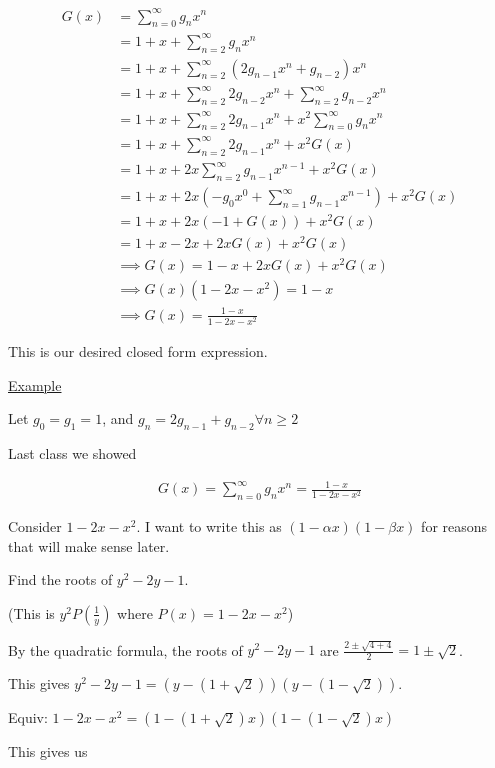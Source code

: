 \documentclass{article}
\begin{document}
\begin{align*}
    G(x) &= \sum_{n=0}^{\infty}g_nx^n \\
    &= 1 + x + \sum_{n=2}^{\infty} g_n x^n \\
    &= 1 + x + \sum_{n=2}^{\infty}(2 g_{n-1} x^n + g_{n-2})x^n \\
    &= 1 + x + \sum_{n=2}^{\infty}2g_{n-2}x^n + \sum_{n=2}^{\infty}g_{n-2}x^n \\
    &= 1 + x + \sum_{n=2}^{\infty}2g_{n-1}x^n + x^2 \sum_{n=0}^{\infty}g_nx^n \\
    &= 1 + x + \sum_{n=2}^{\infty}2g_{n-1}x^n + x^2 G(x) \\
    &= 1 + x + 2x \sum_{n=2}^{\infty}g_{n-1}x^{n-1} + x^2 G(x) \\ 
    &= 1 + x + 2x(-g_0x^0 + \sum_{n=1}^{\infty}g_{n-1}x^{n-1})+ x^2 G(x) \\
    &= 1 + x + 2x(-1 + G(x)) + x^2 G(x) \\
    &= 1 + x - 2x + 2xG(x) + x^2 G(x) \\
    &\implies G(x) = 1-x+2xG(x)+x^2G(x) \\
    &\implies G(x)(1-2x-x^2) = 1 - x \\
    &\implies G(x) = \frac{1-x}{1-2x-x^2}
\end{align*}

This is our desired closed form expression.

\underline{Example}

Let $g_0 = g_1 = 1$, and $g_n = 2g_{n-1} + g_{n-2} \forall n \ge 2$

Last class we showed 

\begin{align*}
    G(x) = \sum_{n=0}^{\infty}g_nx^n = \frac{1-x}{1-2x-x^2}
\end{align*}

Consider $1-2x-x^2$. I want to write this as $(1-\alpha x)(1 - \beta x)$ for reasons that will make sense later.

Find the roots of $y^2 - 2y - 1$.

(This is $y^2P(\frac{1}{y})$ where $P(x) = 1 - 2x - x^2$)

By the quadratic formula, the roots of $y^2 - 2y - 1$ are $\frac{2 \pm \sqrt{4+4}}{2} = 1 \pm \sqrt{2}$.

This gives $y^2 - 2y - 1 = (y - (1 + \sqrt{2}))(y-(1-\sqrt{2}))$.

Equiv: $1-2x-x^2 = (1-(1+\sqrt{2})x)(1-(1-\sqrt{2})x)$

This gives us 
\end{document}
